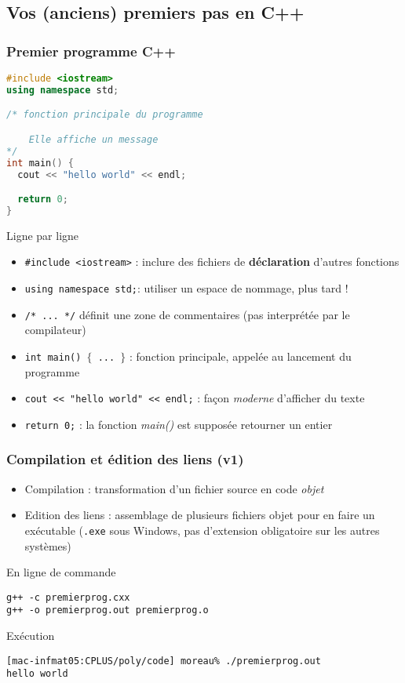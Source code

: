 \subsection{Vos (anciens) premiers pas en C++}

\begin{frame}[fragile]
\frametitle{Premier programme C++}
\begin{lstlisting}[language=C++]
#include <iostream>
using namespace std;

/* fonction principale du programme

	Elle affiche un message
*/
int main() {
  cout << "hello world" << endl;

  return 0;
}
\end{lstlisting}
\end{frame}

\begin{frame}{Ligne par ligne}
\begin{itemize}
\item \texttt{\#include <iostream>} : inclure des fichiers de \textbf{déclaration} d'autres fonctions
\item \texttt{using namespace std;}: utiliser un espace de nommage, plus tard !
\item \texttt{/* ... */} définit une zone de commentaires (pas interprétée par le compilateur)
\item \texttt{int main() $\{$ ... $\}$} : fonction principale, appelée au lancement du programme
\item \texttt{cout << "hello world" << endl;} : façon \textit{moderne} d'afficher du texte
\item \texttt{return 0;} : la fonction \textit{main()} est supposée retourner un entier
\end{itemize}
\end{frame}

\begin{frame}[fragile]
\frametitle{Compilation et édition des liens (v1)}
\begin{itemize}
\item Compilation : transformation d'un fichier source en code \textit{objet}
\item Edition des liens : assemblage de plusieurs fichiers objet pour en faire un exécutable (\texttt{.exe} sous Windows, pas d'extension obligatoire sur les autres systèmes)
\end{itemize}
\pause \begin{block}{En ligne de commande}
\begin{verbatim}
g++ -c premierprog.cxx
g++ -o premierprog.out premierprog.o
\end{verbatim}
\end{block}

\pause \begin{exampleblock}{Exécution}
\begin{verbatim}
[mac-infmat05:CPLUS/poly/code] moreau% ./premierprog.out
hello world
\end{verbatim}
\end{exampleblock}
\end{frame}

